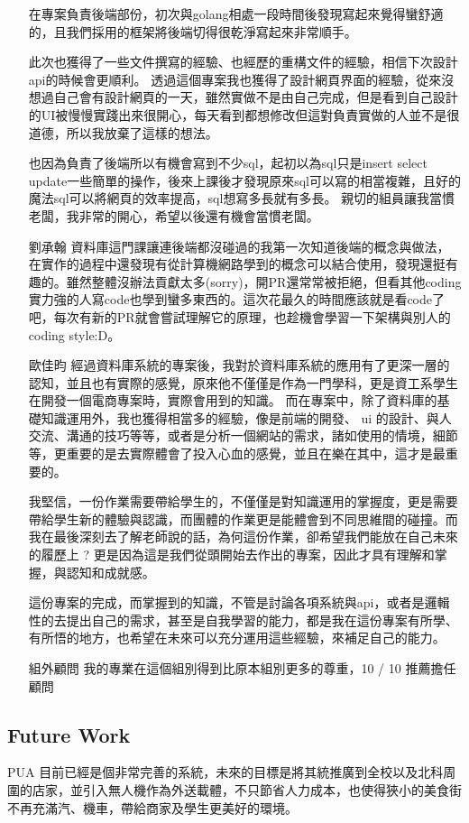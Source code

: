 \documentclass[a4paper, 12pt]{article}
\begin{document}
\begin{itemize}
    在專案負責後端部份，初次與golang相處一段時間後發現寫起來覺得蠻舒適的，且我們採用的框架將後端切得很乾淨寫起來非常順手。
    
    此次也獲得了一些文件撰寫的經驗、也經歷的重構文件的經驗，相信下次設計api的時候會更順利。
    透過這個專案我也獲得了設計網頁界面的經驗，從來沒想過自己會有設計網頁的一天，雖然實做不是由自己完成，但是看到自己設計的UI被慢慢實踐出來很開心，每天看到都想修改但這對負責實做的人並不是很道德，所以我放棄了這樣的想法。

    也因為負責了後端所以有機會寫到不少sql，起初以為sql只是insert select update一些簡單的操作，後來上課後才發現原來sql可以寫的相當複雜，且好的魔法sql可以將網頁的效率提高，sql想寫多長就有多長。
    親切的組員讓我當慣老闆，我非常的開心，希望以後還有機會當慣老闆。
    \item[劉承翰]
    資料庫這門課讓連後端都沒碰過的我第一次知道後端的概念與做法，在實作的過程中還發現有從計算機網路學到的概念可以結合使用，發現還挺有趣的。雖然整體沒辦法貢獻太多(sorry)，開PR還常常被拒絕，但看其他coding實力強的人寫code也學到蠻多東西的。這次花最久的時間應該就是看code了吧，每次有新的PR就會嘗試理解它的原理，也趁機會學習一下架構與別人的coding style:D。
   \item[歐佳昀]
    經過資料庫系統的專案後，我對於資料庫系統的應用有了更深一層的認知，並且也有實際的感覺，原來他不僅僅是作為一門學科，更是資工系學生在開發一個電商專案時，實際會用到的知識。
    而在專案中，除了資料庫的基礎知識運用外，我也獲得相當多的經驗，像是前端的開發、 ui 的設計、與人交流、溝通的技巧等等，或者是分析一個網站的需求，諸如使用的情境，細節等，更重要的是去實際體會了投入心血的感覺，並且在樂在其中，這才是最重要的。

    我堅信，一份作業需要帶給學生的，不僅僅是對知識運用的掌握度，更是需要帶給學生新的體驗與認識，而團體的作業更是能體會到不同思維間的碰撞。而我在最後深刻去了解老師說的話，為何這份作業，卻希望我們能放在自己未來的履歷上 ? 更是因為這是我們從頭開始去作出的專案，因此才具有理解和掌握，與認知和成就感。 

    這份專案的完成，而掌握到的知識，不管是討論各項系統與api，或者是邏輯性的去提出自己的需求，甚至是自我學習的能力，都是我在這份專案有所學、有所悟的地方，也希望在未來可以充分運用這些經驗，來補足自己的能力。
    \item[組外顧問]
    我的專業在這個組別得到比原本組別更多的尊重，10 / 10 推薦擔任顧問 
\end{itemize}

\subsection{Future Work}
PUA 目前已經是個非常完善的系統，未來的目標是將其統推廣到全校以及北科周圍的店家，並引入無人機作為外送載體，不只節省人力成本，也使得狹小的美食街不再充滿汽、機車，帶給商家及學生更美好的環境。
\end{document}
